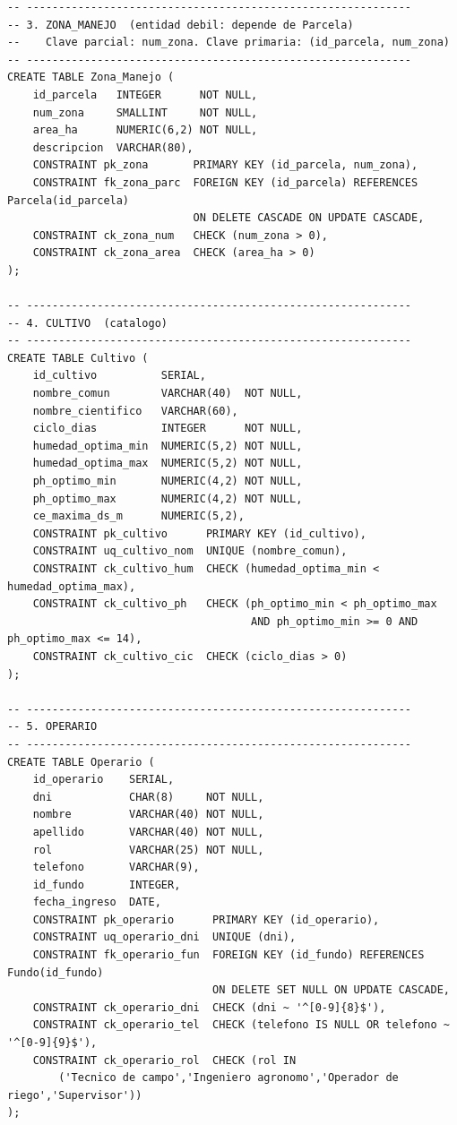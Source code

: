 \documentclass[11pt,letterpaper]{article}
\begin{document}
\begin{lstlisting}[style=sql, title={01\_ddl.sql}]
-- ------------------------------------------------------------
-- 3. ZONA_MANEJO  (entidad debil: depende de Parcela)
--    Clave parcial: num_zona. Clave primaria: (id_parcela, num_zona)
-- ------------------------------------------------------------
CREATE TABLE Zona_Manejo (
    id_parcela   INTEGER      NOT NULL,
    num_zona     SMALLINT     NOT NULL,
    area_ha      NUMERIC(6,2) NOT NULL,
    descripcion  VARCHAR(80),
    CONSTRAINT pk_zona       PRIMARY KEY (id_parcela, num_zona),
    CONSTRAINT fk_zona_parc  FOREIGN KEY (id_parcela) REFERENCES Parcela(id_parcela)
                             ON DELETE CASCADE ON UPDATE CASCADE,
    CONSTRAINT ck_zona_num   CHECK (num_zona > 0),
    CONSTRAINT ck_zona_area  CHECK (area_ha > 0)
);

-- ------------------------------------------------------------
-- 4. CULTIVO  (catalogo)
-- ------------------------------------------------------------
CREATE TABLE Cultivo (
    id_cultivo          SERIAL,
    nombre_comun        VARCHAR(40)  NOT NULL,
    nombre_cientifico   VARCHAR(60),
    ciclo_dias          INTEGER      NOT NULL,
    humedad_optima_min  NUMERIC(5,2) NOT NULL,
    humedad_optima_max  NUMERIC(5,2) NOT NULL,
    ph_optimo_min       NUMERIC(4,2) NOT NULL,
    ph_optimo_max       NUMERIC(4,2) NOT NULL,
    ce_maxima_ds_m      NUMERIC(5,2),
    CONSTRAINT pk_cultivo      PRIMARY KEY (id_cultivo),
    CONSTRAINT uq_cultivo_nom  UNIQUE (nombre_comun),
    CONSTRAINT ck_cultivo_hum  CHECK (humedad_optima_min < humedad_optima_max),
    CONSTRAINT ck_cultivo_ph   CHECK (ph_optimo_min < ph_optimo_max
                                      AND ph_optimo_min >= 0 AND ph_optimo_max <= 14),
    CONSTRAINT ck_cultivo_cic  CHECK (ciclo_dias > 0)
);

-- ------------------------------------------------------------
-- 5. OPERARIO
-- ------------------------------------------------------------
CREATE TABLE Operario (
    id_operario    SERIAL,
    dni            CHAR(8)     NOT NULL,
    nombre         VARCHAR(40) NOT NULL,
    apellido       VARCHAR(40) NOT NULL,
    rol            VARCHAR(25) NOT NULL,
    telefono       VARCHAR(9),
    id_fundo       INTEGER,
    fecha_ingreso  DATE,
    CONSTRAINT pk_operario      PRIMARY KEY (id_operario),
    CONSTRAINT uq_operario_dni  UNIQUE (dni),
    CONSTRAINT fk_operario_fun  FOREIGN KEY (id_fundo) REFERENCES Fundo(id_fundo)
                                ON DELETE SET NULL ON UPDATE CASCADE,
    CONSTRAINT ck_operario_dni  CHECK (dni ~ '^[0-9]{8}$'),
    CONSTRAINT ck_operario_tel  CHECK (telefono IS NULL OR telefono ~ '^[0-9]{9}$'),
    CONSTRAINT ck_operario_rol  CHECK (rol IN
        ('Tecnico de campo','Ingeniero agronomo','Operador de riego','Supervisor'))
);


\end{lstlisting}
\end{document}
